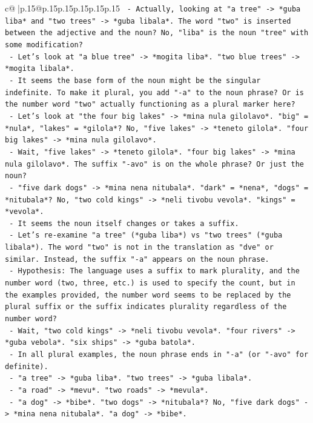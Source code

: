 \documentclass{article}
\begin{document}
{\begin{supertabular}{c@{$\;$}|p{.15\linewidth}@{}p{.15\linewidth}p{.15\linewidth}p{.15\linewidth}p{.15\linewidth}p{.15\linewidth}}
{{{\texttt{  {-} Actually, looking at "a tree" {-}> *guba liba* and "two trees" {-}> *guba libala*. The word "two" is inserted between the adjective and the noun? No, "liba" is the noun "tree" with some modification?} \\
\texttt{  {-} Let's look at "a blue tree" {-}> *mogita liba*. "two blue trees" {-}> *mogita libala*.} \\
\texttt{  {-} It seems the base form of the noun might be the singular indefinite. To make it plural, you add "{-}a" to the noun phrase? Or is the number word "two" actually functioning as a plural marker here?} \\
\texttt{  {-} Let's look at "the four big lakes" {-}> *mina nula gilolavo*. "big" = *nula*, "lakes" = *gilola*? No, "five lakes" {-}> *teneto gilola*. "four big lakes" {-}> *mina nula gilolavo*.} \\
\texttt{  {-} Wait, "five lakes" {-}> *teneto gilola*. "four big lakes" {-}> *mina nula gilolavo*. The suffix "{-}avo" is on the whole phrase? Or just the noun?} \\
\texttt{  {-} "five dark dogs" {-}> *mina nena nitubala*. "dark" = *nena*, "dogs" = *nitubala*? No, "two cold kings" {-}> *neli tivobu vevola*. "kings" = *vevola*.} \\
\texttt{  {-} It seems the noun itself changes or takes a suffix.} \\
\texttt{  {-} Let's re{-}examine "a tree" (*guba liba*) vs "two trees" (*guba libala*). The word "two" is not in the translation as "dve" or similar. Instead, the suffix "{-}a" appears on the noun phrase.} \\
\texttt{  {-} Hypothesis: The language uses a suffix to mark plurality, and the number word (two, three, etc.) is used to specify the count, but in the examples provided, the number word seems to be replaced by the plural suffix or the suffix indicates plurality regardless of the number word?} \\
\texttt{  {-} Wait, "two cold kings" {-}> *neli tivobu vevola*. "four rivers" {-}> *guba vebola*. "six ships" {-}> *guba batola*.} \\
\texttt{  {-} In all plural examples, the noun phrase ends in "{-}a" (or "{-}avo" for definite).} \\
\texttt{  {-} "a tree" {-}> *guba liba*. "two trees" {-}> *guba libala*.} \\
\texttt{  {-} "a road" {-}> *mevu*. "two roads" {-}> *mevula*.} \\
\texttt{  {-} "a dog" {-}> *bibe*. "two dogs" {-}> *nitubala*? No, "five dark dogs" {-}> *mina nena nitubala*. "a dog" {-}> *bibe*.} \\
}}}
\end{supertabular}}
\end{document}
